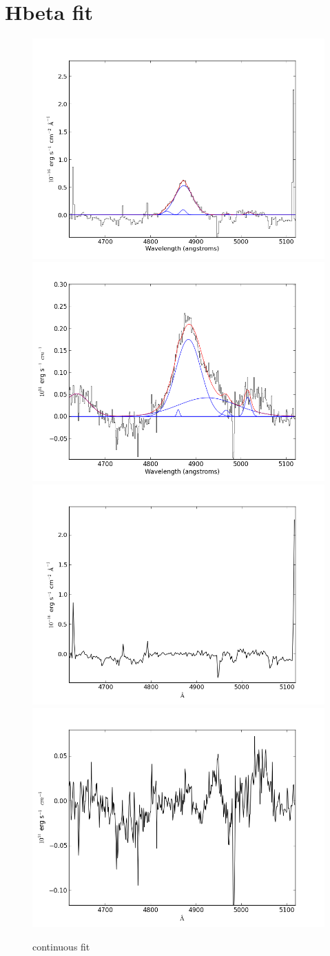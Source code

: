 \documentclass[usenatbib]{mn2e}
\begin{document}
\newpage


\section{Hbeta fit}

\begin{figure}
\begin{center}
\includegraphics[width=0.46\linewidth,angle=0]{Hbeta_0.png}
\vspace{5mm}
\includegraphics[width=0.49\linewidth,angle=0]{Hbeta_1.png}\\
\includegraphics[width=0.46\linewidth,angle=0]{Hbeta_res_0.png}
\hspace{5mm}
\includegraphics[width=0.49\linewidth,angle=0]{Hbeta_res_1.png}\\
\end{center} 
\caption{continuous fit \label{fig:landscape}}   
\end{figure}
\end{document}
